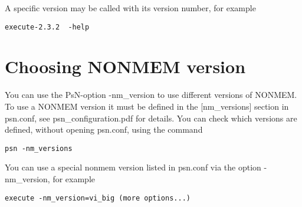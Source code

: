 A specific version may be called with its version number, for example

\begin{verbatim}
execute-2.3.2  -help 
\end{verbatim}

\section{Choosing NONMEM version}
You can use the PsN-option -nm\_version to use different versions of NONMEM. To use a NONMEM version it must be defined in the [nm\_versions] section in psn.conf, see psn\_configuration.pdf for details. You can check which versions are defined, without opening psn.conf, using the command

\begin{verbatim}
psn -nm_versions
\end{verbatim}

You can use a special nonmem version listed in psn.conf via the option -nm\_version, for example

\begin{verbatim}
execute -nm_version=vi_big (more options...)
\end{verbatim}

